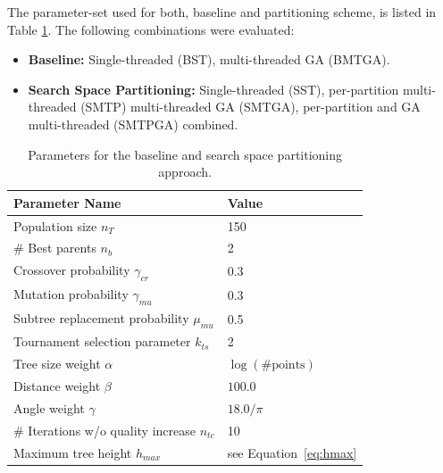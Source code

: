 The parameter-set used for both, baseline and partitioning scheme, is listed in Table \ref{tab:gaparams}.
The following combinations were evaluated:
\begin{itemize}
	\item \textbf{Baseline:} Single-threaded (BST), multi-threaded \ac{GA} (BMTGA).
	\item \textbf{Search Space Partitioning:} Single-threaded (SST), per-partition multi-threaded (SMTP) multi-threaded \ac{GA} (SMTGA), per-partition and \ac{GA} multi-threaded (SMTPGA) combined.
\end{itemize}
\begin{table}[h]
	\centering
	\begin{tabular}{|l|l|}
		\hline
		\textbf{Parameter Name} & \textbf{Value}  \\
		\hline
		Population size $n_T$ & 150 \\
		\hline
		\# Best parents $n_b$ & 2 \\
		\hline
		Crossover probability $\gamma_{cr}$& 0.3 \\
		\hline
		Mutation probability $\gamma_{mu}$& 0.3 \\
		\hline
		Subtree replacement probability $\mu_{mu}$& 0.5 \\
		\hline
		Tournament selection parameter $k_{ts}$ & 2\\
		\hline
		Tree size weight $\alpha$& $\log(\text{\#points})$\\
		\hline
		Distance weight $\beta$& $100.0$ \\
		\hline
		Angle weight $\gamma$& $18.0/\pi$ \\
		\hline 
		\# Iterations w/o quality increase $n_{tc}$ & 10 \\
		\hline 
		Maximum tree height $h_{max}$ & see Equation~\ref{eq:hmax} \\
		\hline 
	\end{tabular}
	\caption{Parameters for the baseline and search space partitioning approach.}
	\label{tab:gaparams}
\end{table}   
